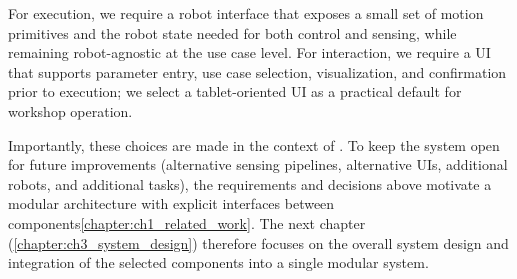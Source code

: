 For execution, we require a robot interface that exposes a small set of motion primitives and the robot state needed for both control and sensing, while remaining robot-agnostic at the use case level. For interaction, we require a UI that supports parameter entry, use case selection, visualization, and confirmation prior to execution; we select a tablet-oriented UI as a practical default for workshop operation.

Importantly, these choices are made in the context of \DIFdelbegin {}\DIFdelend \DIFaddbegin {}\DIFaddend . To keep the system open for future improvements (alternative sensing pipelines, alternative UIs, additional robots, \DIFaddbegin {}\DIFaddend and additional tasks), the requirements and decisions above motivate a modular architecture with explicit interfaces between components\DIFaddbegin {}\autoref{chapter:ch1_related_work}\DIFaddend . The next chapter (\autoref{chapter:ch3_system_design}) therefore focuses on the overall system design and integration of the selected components into a single modular system.
